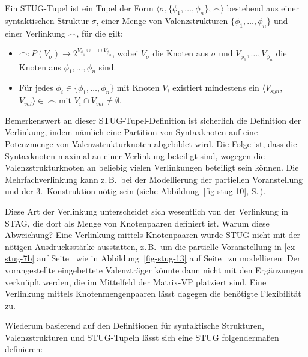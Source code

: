 \begin{definition}
Ein STUG-Tupel ist ein Tupel der Form $\langle \sigma,\{\phi_1,$\linebreak $\ldots,\phi_n\}, \frown\rangle$ bestehend aus einer syntaktischen Struktur $\sigma$, einer Menge von Valenzstrukturen $\{\phi_1,\ldots,\phi_n\}$ und einer Verlinkung $\frown$, für die gilt:
\begin{itemize}
  \item $\frown: P(V_\sigma) \to 2^{V_{\phi_1} \cup \ldots \cup V_{\phi_n}}$, wobei $V_\sigma$ die Knoten aus $\sigma$ und $V_{\phi_1}, \ldots, V_{\phi_n}$ die Knoten aus $\phi_1,\ldots,\phi_n$ sind.
  \item Für jedes $\phi_i \in \{\phi_1,\ldots,\phi_n\}$ mit Knoten $V_i$ existiert mindestens ein $\langle V_{\mathit{syn}},$ $V_{\mathit{val}}\rangle \in \ \frown$ mit $V_i \cap V_{\mathit{val}} \ne \emptyset$.
\end{itemize}
\end{definition}
Bemerkenswert an dieser STUG-Tupel-Definition ist sicherlich die Definition der Verlinkung, indem nämlich eine Partition von Syntaxknoten auf eine Potenzmenge von Valenzstrukturknoten abgebildet wird. Die Folge ist, dass die Syntaxknoten maximal an einer Verlinkung beteiligt sind, wogegen die Valenzstrukturknoten an beliebig vielen Verlinkungen beteiligt sein können. Die Mehrfachverlinkung kann z.\,B.\ bei der Modellierung der partiellen Voranstellung und der 3.~Konstruktion nötig sein (siehe Abbildung~\ref{fig-stug-10}, S.\,\pageref{fig-stug-10}).     

Diese Art der Verlinkung unterscheidet sich wesentlich von der Verlinkung in STAG, die dort als Menge von Knotenpaaren definiert ist. Warum diese Abweichung? Eine Verlinkung mittels Knotenpaaren würde STUG nicht mit der nötigen Ausdrucksstärke ausstatten, z.\,B.\ um die partielle Voranstellung in \ref{ex-stug-7b} auf Seite~\pageref{ex-stug-7b} wie in Abbildung~\ref{fig-stug-13} auf Seite~\pageref{fig-stug-13} zu modellieren: Der vorangestellte eingebettete Valenzträger könnte dann nicht mit den Ergänzungen verknüpft werden, die im Mittelfeld der Matrix-VP platziert sind. Eine Verlinkung mittels Knotenmengenpaaren lässt dagegen die benötigte Flexibilität zu.   

Wiederum basierend auf den Definitionen für syntaktische Strukturen, Valenzstrukturen und STUG-Tupeln lässt sich eine STUG folgenderma\ss en definieren:

